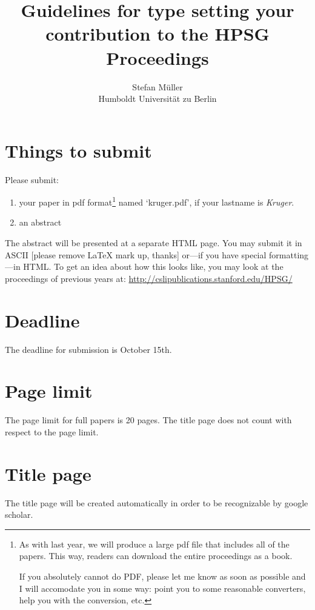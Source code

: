 \documentclass[11pt,a4paper,fleqn]{article}
\title{Guidelines for type setting your contribution to the HPSG Proceedings}
\author{Stefan Müller\\
Humboldt Universität zu Berlin}
\begin{document}
\maketitle


\section{Things to submit}

Please submit:
\begin{enumerate}
\item your paper in pdf format\footnote{
As with last year, we will produce a large pdf file that includes all
of the papers.  This way, readers can download the entire proceedings
as a book.

If you absolutely cannot do PDF, please let me know as soon as
possible and I will accomodate you in some way: point you to some
reasonable converters, help you with the conversion, etc.}
%
 named `kruger.pdf', if your lastname is \emph{Kruger}.



\item an abstract
\end{enumerate}
The abstract will be presented at a separate HTML page. You may submit it in ASCII [please remove \LaTeX{} mark up, thanks]
or---if you have special formatting---in HTML. 
To get an idea about how this looks like,
you may look at the proceedings of previous years at:\newline
\url{http://cslipublications.stanford.edu/HPSG/}\section{Deadline}

The deadline for submission is October 15th.

\section{Page limit}

The page limit for full papers is 20 pages. The title page does not count with respect to the page limit.


\section{Title page}


The title page will be created automatically in order to be recognizable by google scholar.
\end{document}
